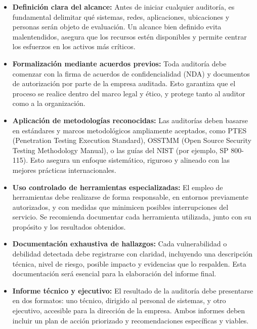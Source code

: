 \documentclass[a4paper, 10pt]{article}
\begin{document}
    \begin{itemize}
    
        \item \textbf{Definición clara del alcance:}  
        Antes de iniciar cualquier auditoría, es fundamental delimitar qué sistemas, redes, aplicaciones, ubicaciones y personas serán objeto de evaluación. Un alcance bien definido evita malentendidos, asegura que los recursos estén disponibles y permite centrar los esfuerzos en los activos más críticos.
    
        \item \textbf{Formalización mediante acuerdos previos:}  
        Toda auditoría debe comenzar con la firma de acuerdos de confidencialidad (NDA) y documentos de autorización por parte de la empresa auditada. Esto garantiza que el proceso se realice dentro del marco legal y ético, y protege tanto al auditor como a la organización.
    
        \item \textbf{Aplicación de metodologías reconocidas:}  
        Las auditorías deben basarse en estándares y marcos metodológicos ampliamente aceptados, como PTES (Penetration Testing Execution Standard), OSSTMM (Open Source Security Testing Methodology Manual), o las guías del NIST (por ejemplo, SP 800-115). Esto asegura un enfoque sistemático, riguroso y alineado con las mejores prácticas internacionales.
    
        \item \textbf{Uso controlado de herramientas especializadas:}  
        El empleo de herramientas debe realizarse de forma responsable, en entornos previamente autorizados, y con medidas que minimicen posibles interrupciones del servicio. Se recomienda documentar cada herramienta utilizada, junto con su propósito y los resultados obtenidos.
    
        \item \textbf{Documentación exhaustiva de hallazgos:}  
        Cada vulnerabilidad o debilidad detectada debe registrarse con claridad, incluyendo una descripción técnica, nivel de riesgo, posible impacto y evidencias que lo respalden. Esta documentación será esencial para la elaboración del informe final.
    
        \item \textbf{Informe técnico y ejecutivo:}  
        El resultado de la auditoría debe presentarse en dos formatos: uno técnico, dirigido al personal de sistemas, y otro ejecutivo, accesible para la dirección de la empresa. Ambos informes deben incluir un plan de acción priorizado y recomendaciones específicas y viables.
    

\end{itemize}
\end{document}

